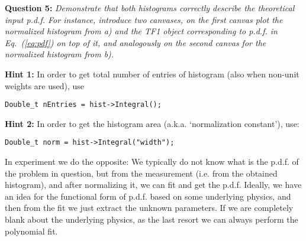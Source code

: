 \documentclass[11pt]{article}
\begin{document}
\bigskip

\noindent\textbf{Question 5:} {\it Demonstrate that both histograms correctly describe the theoretical input p.d.f. For instance, introduce two canvases, on the first canvas plot the normalized histogram from a) and the TF1 object corresponding to p.d.f. in Eq.~(\ref{eq:pdf}) on top of it, and analogously on the second canvas for the normalized histogram from b).}

\bigskip

\noindent \textbf{{Hint 1:}} In order to get total number of entries of histogram (also when non-unit weights are used), use
{\small
\begin{verbatim}
Double_t nEntries = hist->Integral();
\end{verbatim}
}

\noindent \textbf{{Hint 2:}} In order to get the histogram area (a.k.a. `normalization constant'), use:
{\small
\begin{verbatim}
Double_t norm = hist->Integral("width");
\end{verbatim}
}

\bigskip

In experiment we do the opposite: We typically do not know what is the p.d.f. of the problem in question, but from the measurement (i.e. from the obtained histogram), and after normalizing it, we can fit and get the p.d.f. Ideally, we have an idea for the functional form of p.d.f. based on some underlying physics, and then from the fit we just extract the unknown parameters. If we are completely blank about the underlying physics, as the last resort we can always perform the polynomial fit.
\end{document}
